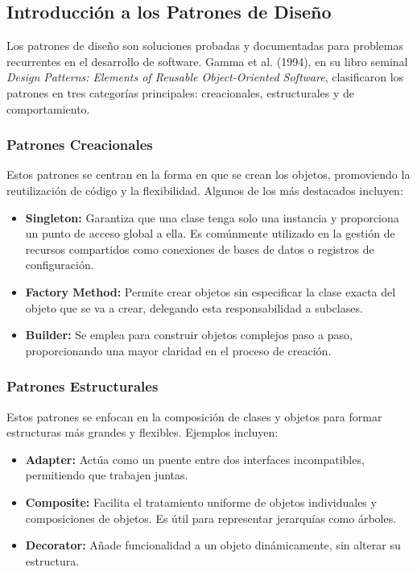 \documentclass[12pt, a4paper, twocolumn]{article}
\begin{document}
\subsection{Introducción a los Patrones de Diseño}
Los patrones de diseño son soluciones probadas y documentadas para problemas recurrentes en el desarrollo de software. Gamma et al. (1994), en su libro seminal \textit{Design Patterns: Elements of Reusable Object-Oriented Software}, clasificaron los patrones en tres categorías principales: creacionales, estructurales y de comportamiento.

\subsubsection{Patrones Creacionales}
Estos patrones se centran en la forma en que se crean los objetos, promoviendo la reutilización de código y la flexibilidad. Algunos de los más destacados incluyen:
\begin{itemize}
    \item \textbf{Singleton:} Garantiza que una clase tenga solo una instancia y proporciona un punto de acceso global a ella. Es comúnmente utilizado en la gestión de recursos compartidos como conexiones de bases de datos o registros de configuración.
    \item \textbf{Factory Method:} Permite crear objetos sin especificar la clase exacta del objeto que se va a crear, delegando esta responsabilidad a subclases.
    \item \textbf{Builder:} Se emplea para construir objetos complejos paso a paso, proporcionando una mayor claridad en el proceso de creación.
\end{itemize}

\subsubsection{Patrones Estructurales}
Estos patrones se enfocan en la composición de clases y objetos para formar estructuras más grandes y flexibles. Ejemplos incluyen:
\begin{itemize}
    \item \textbf{Adapter:} Actúa como un puente entre dos interfaces incompatibles, permitiendo que trabajen juntas.
    \item \textbf{Composite:} Facilita el tratamiento uniforme de objetos individuales y composiciones de objetos. Es útil para representar jerarquías como árboles.
    \item \textbf{Decorator:} Añade funcionalidad a un objeto dinámicamente, sin alterar su estructura.
\end{itemize}
\end{document}
